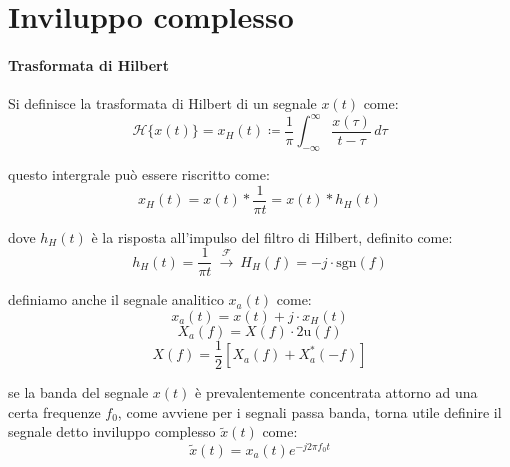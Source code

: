\section*{Inviluppo complesso}

\paragraph*{Trasformata di Hilbert}
Si definisce la trasformata di Hilbert di un segnale \( x(t) \) come:
\[
    \mathcal{H}\{x(t)\} = x_H(t) \coloneqq \frac{1}{\pi} \int_{-\infty}^{\infty} \frac{x(\tau)}{t - \tau} \, d\tau
\]


questo intergrale può essere riscritto come: 
\[
    x_H(t) = x(t) \ast \frac{1}{\pi t} = x(t) \ast h_H(t)
\]

dove \( h_H(t) \) è la risposta all'impulso del filtro di Hilbert, definito come:
\[
    h_H(t) = \frac{1}{\pi t} \ \xrightarrow{\mathcal{F}} \ H_H(f) = -j\cdot \text{sgn}(f)
\]



definiamo anche il segnale analitico \( x_a(t) \) come:
\[
    x_a(t) = x(t) + j \cdot x_H(t)
\]
\[
    X_a(f) = X(f) \cdot 2\text{u}(f)   
\]
\[
    X(f) = \frac{1}{2} \left[ X_a(f) + X_a^*(-f) \right]    
\]

se la banda del segnale \( x(t) \) è prevalentemente concentrata attorno ad una certa frequenze $f_0$, come avviene per i segnali passa banda,
torna utile definire il segnale detto inviluppo complesso \( \tilde{x}(t) \) come:
\[
    \tilde{x}(t) = x_a(t) e^{-j2\pi f_0 t}
\]